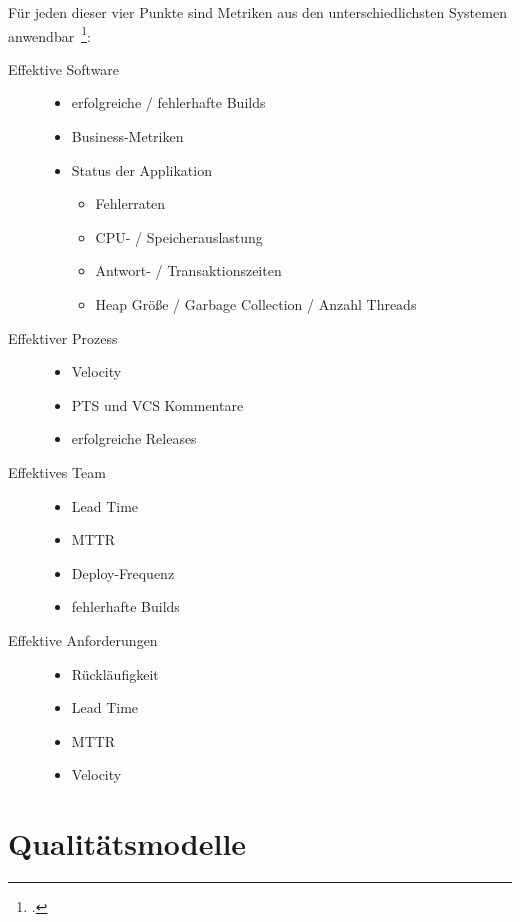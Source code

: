Für jeden dieser vier Punkte sind Metriken aus den unterschiedlichsten Systemen anwendbar~\footcite[vgl.][S.219ff]{davis_agile_2015}:

\begin{description}
  \item[Effektive Software] \hfill
  \begin{itemize}[noitemsep]
    \item erfolgreiche / fehlerhafte Builds
    \item Business-Metriken
    \item Status der Applikation
    \begin{itemize}[noitemsep]
      \item Fehlerraten
      \item CPU- / Speicherauslastung
      \item Antwort- / Transaktionszeiten
      \item Heap Größe / Garbage Collection / Anzahl Threads
    \end{itemize}
  \end{itemize}
  \item[Effektiver Prozess] \hfill
  \begin{itemize}[noitemsep]
    \item Velocity
    \item \ac{PTS} und \ac{VCS} Kommentare
    \item erfolgreiche Releases
  \end{itemize}
  \item[Effektives Team] \hfill
  \begin{itemize}[noitemsep]
    \item Lead Time
    \item \ac{MTTR}
    \item Deploy-Frequenz
    \item fehlerhafte Builds
  \end{itemize}
  \item[Effektive Anforderungen] \hfill
  \begin{itemize}[noitemsep]
    \item Rückläufigkeit
    \item Lead Time
    \item \ac{MTTR}
    \item Velocity
  \end{itemize}
\end{description}

\clearpage
\section{Qualitätsmodelle}

